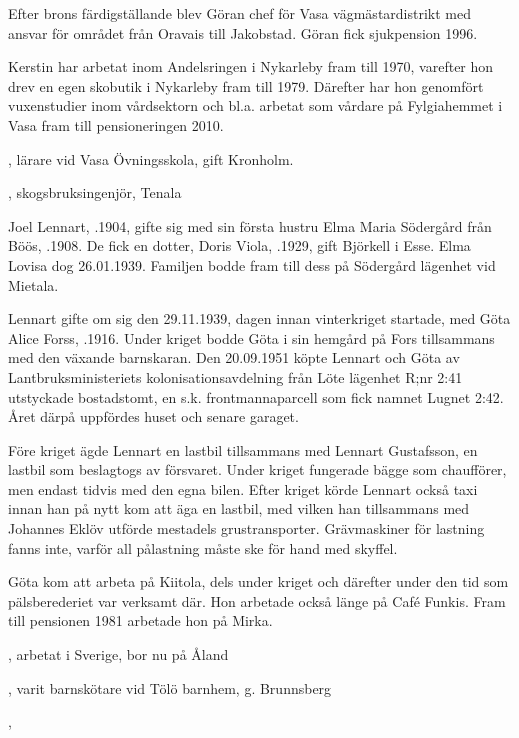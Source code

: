 Efter brons färdigställande blev Göran chef för Vasa vägmästardistrikt med ansvar för området från Oravais till Jakobstad. Göran fick sjukpension 1996.

Kerstin har arbetat inom Andelsringen i Nykarleby fram till 1970, varefter hon drev en egen skobutik i Nykarleby fram till 1979. Därefter har hon genomfört vuxenstudier inom vårdsektorn och bl.a. arbetat som vårdare på Fylgiahemmet i Vasa fram till pensioneringen 2010.
\begin{jhchildren}
  \item {}, lärare vid Vasa Övningsskola, gift Kronholm.
  \item {}, skogsbruksingenjör, Tenala
\end{jhchildren}


%
Joel Lennart, .1904, gifte sig med sin första hustru Elma Maria Södergård från Böös, .1908. De fick en dotter, Doris Viola, .1929, gift Björkell i Esse. Elma Lovisa dog 26.01.1939. Familjen bodde fram till dess på Södergård lägenhet vid Mietala.

Lennart gifte om sig den 29.11.1939, dagen innan vinterkriget startade, med Göta Alice Forss, .1916. Under kriget bodde Göta i sin hemgård på Fors tillsammans med den växande barnskaran. Den 20.09.1951 köpte Lennart och Göta av Lantbruksministeriets kolonisationsavdelning från Löte lägenhet R;nr 2:41 utstyckade bostadstomt, en s.k. frontmannaparcell som fick namnet Lugnet 2:42. Året därpå uppfördes huset och senare garaget.

Före kriget ägde Lennart en lastbil tillsammans med Lennart Gustafsson, en lastbil som beslagtogs av försvaret. Under kriget fungerade bägge som chaufförer, men endast tidvis med den egna bilen. Efter kriget körde Lennart också taxi innan han på nytt kom att äga en lastbil, med vilken han tillsammans med Johannes Eklöv utförde mestadels grustransporter. Grävmaskiner för lastning fanns inte, varför all pålastning måste ske för hand med skyffel.

Göta kom att arbeta på Kiitola, dels under kriget och därefter under den tid som pälsberederiet var verksamt där. Hon arbetade också länge på Café Funkis. Fram till pensionen 1981 arbetade hon på Mirka.
\begin{jhchildren}
  \item {}, arbetat i Sverige, bor nu på Åland
  \item {}, varit barnskötare vid Tölö barnhem, g. Brunnsberg
  \item {},
\end{jhchildren}

